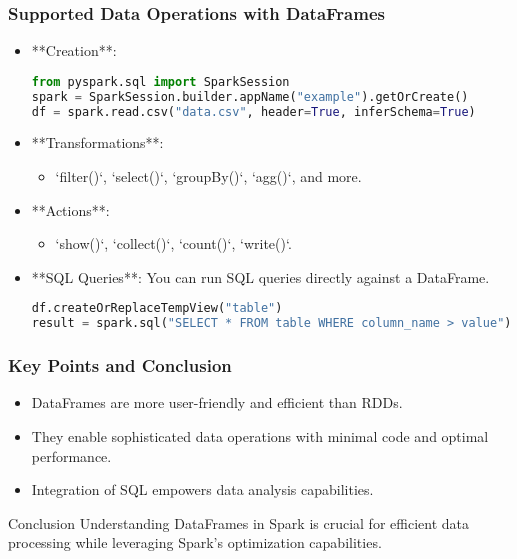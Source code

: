 \documentclass[aspectratio=169]{beamer}
\begin{document}
\begin{frame}[fragile]
    \frametitle{Supported Data Operations with DataFrames}
    \begin{itemize}
        \item **Creation**: 
        \begin{lstlisting}[language=Python]
from pyspark.sql import SparkSession
spark = SparkSession.builder.appName("example").getOrCreate()
df = spark.read.csv("data.csv", header=True, inferSchema=True)
        \end{lstlisting}
        \item **Transformations**: 
        \begin{itemize}
            \item `filter()`, `select()`, `groupBy()`, `agg()`, and more.
        \end{itemize}
        \item **Actions**: 
        \begin{itemize}
            \item `show()`, `collect()`, `count()`, `write()`.
        \end{itemize}
        \item **SQL Queries**: You can run SQL queries directly against a DataFrame.
        \begin{lstlisting}[language=Python]
df.createOrReplaceTempView("table")
result = spark.sql("SELECT * FROM table WHERE column_name > value")
        \end{lstlisting}
    \end{itemize}
\end{frame}

\begin{frame}
    \frametitle{Key Points and Conclusion}
    \begin{itemize}
        \item DataFrames are more user-friendly and efficient than RDDs.
        \item They enable sophisticated data operations with minimal code and optimal performance.
        \item Integration of SQL empowers data analysis capabilities.
    \end{itemize}
    
    \begin{block}{Conclusion}
        Understanding DataFrames in Spark is crucial for efficient data processing while leveraging Spark’s optimization capabilities.
    \end{block}
\end{frame}
\end{document}

